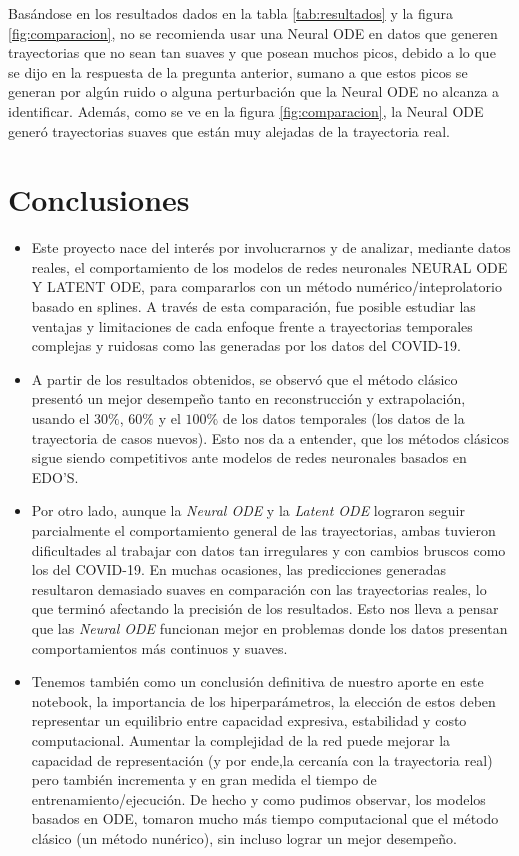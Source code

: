 \documentclass[11pt,letterpaper]{article}
\begin{document}
Basándose en los resultados dados en la tabla \ref{tab:resultados} y la figura \ref{fig:comparacion}, no se recomienda usar una Neural ODE en datos que generen trayectorias que no sean tan suaves y que posean muchos picos, debido a lo que se dijo en la respuesta de la pregunta anterior, sumano a que estos picos se generan por algún ruido o alguna perturbación que la Neural ODE no alcanza a identificar.  Además, como se ve en la figura \ref{fig:comparacion}, la Neural ODE generó trayectorias suaves que están muy alejadas de la trayectoria real.

\section{Conclusiones}
\begin{itemize}
    \item Este proyecto nace del interés por involucrarnos y de analizar, mediante datos reales, el comportamiento de los modelos de redes neuronales NEURAL ODE Y LATENT ODE, para compararlos con un método numérico/inteprolatorio basado en splines. A través de esta comparación, fue posible estudiar las ventajas y limitaciones de cada enfoque frente a trayectorias temporales complejas y ruidosas como las generadas por los datos del COVID-19. 

    \item A partir de los resultados obtenidos, se observó que el método clásico presentó un mejor desempeño tanto en reconstrucción y extrapolación, usando el $30\%$, $60\%$ y el $100\%$ de los datos temporales (los datos de la trayectoria de casos nuevos). Esto nos da a entender, que los métodos clásicos sigue siendo competitivos ante modelos de redes neuronales basados en EDO'S.

    \item Por otro lado, aunque la \textit{Neural ODE} y la \textit{Latent ODE} lograron seguir parcialmente el comportamiento general de las trayectorias, ambas tuvieron dificultades al trabajar con datos tan irregulares y con cambios bruscos como los del COVID-19. En muchas ocasiones, las predicciones generadas resultaron demasiado suaves en comparación con las trayectorias reales, lo que terminó afectando la precisión de los resultados. Esto nos lleva a pensar que las \textit{Neural ODE} funcionan mejor en problemas donde los datos presentan comportamientos más continuos y suaves.

    \item Tenemos también como un conclusión definitiva de nuestro aporte en este notebook, la importancia de los hiperparámetros, la elección de estos deben representar un equilibrio entre capacidad expresiva, estabilidad y costo computacional. Aumentar la complejidad de la red puede mejorar la capacidad de representación (y por ende,la cercanía con la trayectoria real) pero también incrementa y en gran medida el tiempo de entrenamiento/ejecución. De hecho y como pudimos observar, los modelos basados en ODE, tomaron mucho más tiempo computacional que el método clásico (un método nunérico), sin incluso lograr un mejor desempeño.

\end{itemize}
\end{document}
